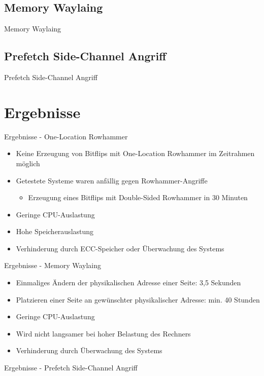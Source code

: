 \documentclass[german,10pt,xcolor=colortbl,compress
]{beamer}
\begin{document}
\subsection{Memory Waylaing}
\begin{frame}{Memory Waylaing}
\end{frame}

\subsection{Prefetch Side-Channel Angriff}
\begin{frame}{Prefetch Side-Channel Angriff}

\end{frame}

\section{Ergebnisse}
\begin{frame}{Ergebnisse - One-Location Rowhammer}
\begin{itemize}
\item Keine Erzeugung von Bitflips mit One-Location Rowhammer im Zeitrahmen möglich
\item Getestete Systeme waren anfällig gegen Rowhammer-Angriffe
	\begin{itemize}
	\item Erzeugung eines Bitflips mit Double-Sided Rowhammer in 30 Minuten
	\end{itemize}
\item Geringe CPU-Auslastung
\item Hohe Speicherauslastung
\item Verhinderung durch ECC-Speicher oder Überwachung des Systems
\end{itemize}

\end{frame}

\begin{frame}{Ergebnisse - Memory Waylaing}
\begin{itemize}
\item Einmaliges Ändern der physikalischen Adresse einer Seite: 3,5 Sekunden
\item Platzieren einer Seite an gewünschter physikalischer Adresse: min. 40 Stunden
\item Geringe CPU-Auslastung
\item Wird nicht langsamer bei hoher Belastung des Rechners
\item Verhinderung durch Überwachung des Systems
\end{itemize}

\end{frame}
\begin{frame}{Ergebnisse - Prefetch Side-Channel Angriff}

\end{frame}
\end{document}
